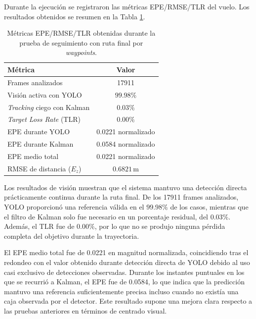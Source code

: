 \vspace{0.3cm}

Durante la ejecución se registraron las métricas EPE/RMSE/TLR del vuelo. Los resultados obtenidos se resumen en la Tabla \ref{tab:metricas-seguimiento-final}.

\begin{table}[H]
\centering
\caption{Métricas EPE/RMSE/TLR obtenidas durante la prueba de seguimiento con ruta final por \textit{waypoints}.}
\label{tab:metricas-seguimiento-final}
\begin{tabular}{lc}
\hline
\textbf{Métrica} & \textbf{Valor} \\
\hline
Frames analizados & 17911 \\
Visión activa con YOLO & $99.98\%$ \\
\textit{Tracking} ciego con Kalman & $0.03\%$ \\
\textit{Target Loss Rate} (TLR) & $0.00\%$ \\
EPE durante YOLO & 0.0221 normalizado \\
EPE durante Kalman & 0.0584 normalizado \\
EPE medio total & 0.0221 normalizado \\
RMSE de distancia ($E_z$) & $0.6821\,\mathrm{m}$ \\
\hline
\end{tabular}
\end{table}

\vspace{0.3cm}

Los resultados de visión muestran que el sistema mantuvo una detección directa prácticamente continua durante la ruta final. De los 17911 frames analizados, YOLO proporcionó una referencia válida en el $99.98\%$ de los casos, mientras que el filtro de Kalman solo fue necesario en un porcentaje residual, del $0.03\%$. Además, el TLR fue de $0.00\%$, por lo que no se produjo ninguna pérdida completa del objetivo durante la trayectoria.

\vspace{0.3cm}

El EPE medio total fue de 0.0221 en magnitud normalizada, coincidiendo tras el redondeo con el valor obtenido durante detección directa de YOLO debido al uso casi exclusivo de detecciones observadas. Durante los instantes puntuales en los que se recurrió a Kalman, el EPE fue de 0.0584, lo que indica que la predicción mantuvo una referencia suficientemente precisa incluso cuando no existía una caja observada por el detector. Este resultado supone una mejora clara respecto a las pruebas anteriores en términos de centrado visual.

